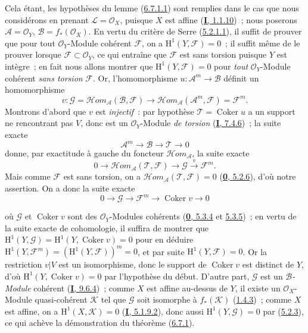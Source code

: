 Cela étant, les hypothèses du lemme
(\hyperref[II.6.7.1.1-fr]{6.7.1.1}) sont remplies dans le cas que nous
considérons en prenant $\mathcal{L}=\mathcal{O}_X$, puisque $X$ est affine
(\hyperref[I.1.1.10-fr]{\textbf{I}, 1.1.10})~; nous poserons
$\mathcal{A}=\mathcal{O}_Y$, $\mathcal{B}=f_*(\mathcal{O}_X)$. En vertu du
critère de Serre (\hyperref[II.5.2.1.1-fr]{5.2.1.1}), il suffit de prouver
que pour tout $\mathcal{O}_Y$-Module cohérent $\mathcal{F}$, on a
$\mathrm{H}^1(Y,\mathcal{F})=0$~; il suffit même de le prouver lorsque
$\mathcal{F}\subset\mathcal{O}_Y$, ce qui entraîne que $\mathcal{F}$ est
sans torsion puisque $Y$ est intègre~; en fait nous allons montrer que
$\mathrm{H}^1(Y,\mathcal{F})=0$ pour \emph{tout} $\mathcal{O}_Y$-Module
cohérent \emph{sans torsion} $\mathcal{F}$. Or, l'homomorphisme
$u:\mathcal{A}^m\to\mathcal{B}$ définit un homomorphisme
\[
v:\mathcal{G}
=\mathcal{H}om_{\mathcal{A}}(\mathcal{B},\mathcal{F})
\longrightarrow
\mathcal{H}om_{\mathcal{A}}(\mathcal{A}^m,\mathcal{F})
=\mathcal{F}^m.
\]
Montrons d'abord que $v$ est \emph{injectif}~: par hypothèse
$\mathcal{T}=\operatorname{Coker}u$ a un support ne rencontrant pas $V$, donc
est un $\mathcal{O}_Y$-Module \emph{de torsion}
(\hyperref[I.7.4.6-fr]{\textbf{I}, 7.4.6})~; la suite exacte
\[
\mathcal{A}^m\longrightarrow\mathcal{B}\longrightarrow\mathcal{T}
\longrightarrow0
\]
donne, par exactitude à gauche du foncteur
$\mathcal{H}om_{\mathcal{A}}$, la suite exacte
\[
0\longrightarrow
\mathcal{H}om_{\mathcal{A}}(\mathcal{T},\mathcal{F})
\longrightarrow\mathcal{G}\xrightarrow{v}\mathcal{F}^m.
\]
Mais comme $\mathcal{F}$ est sans torsion, on a
$\mathcal{H}om_{\mathcal{A}}(\mathcal{T},\mathcal{F})=0$
(\hyperref[0.5.2.6-fr]{\textbf{0}, 5.2.6}), d'où notre assertion. On a donc la suite
exacte
\[
0\longrightarrow\mathcal{G}\longrightarrow\mathcal{F}^m
\longrightarrow\operatorname{Coker}v\longrightarrow0
\]


où $\mathcal{G}$ et $\operatorname{Coker}v$ sont des
$\mathcal{O}_Y$-Modules cohérents
(\hyperref[0.5.3.4-fr]{\textbf{0}, 5.3.4} et
\hyperref[0.5.3.5-fr]{5.3.5})~; en vertu de la suite exacte de cohomologie,
il suffira de montrer que
$\mathrm{H}^1(Y,\mathcal{G})
=\mathrm{H}^1(Y,\operatorname{Coker}v)=0$ pour en déduire
$\mathrm{H}^1(Y,\mathcal{F}^m)
=(\mathrm{H}^1(Y,\mathcal{F}))^m=0$, et par suite
$\mathrm{H}^1(Y,\mathcal{F})=0$. Or la restriction $v|V$ est un isomorphisme,
donc le support de $\operatorname{Coker}v$ est distinct de $Y$, d'où
$\mathrm{H}^1(Y,\operatorname{Coker}v)=0$ par l'hypothèse du début. D'autre
part, $\mathcal{G}$ est un \emph{$\mathcal{B}$-Module} cohérent
(\hyperref[I.9.6.4-fr]{\textbf{I}, 9.6.4})~; comme $X$ est affine au-dessus de $Y$, il
existe un $\mathcal{O}_X$-Module quasi-cohérent $\mathcal{K}$ tel que
$\mathcal{G}$ soit isomorphe à $f_*(\mathcal{K})$
(\hyperref[II.1.4.3-fr]{1.4.3})~; comme $X$ est affine, on a
$\mathrm{H}^1(X,\mathcal{K})=0$
(\hyperref[I.5.1.9.2-fr]{\textbf{I}, 5.1.9.2}), donc aussi
$\mathrm{H}^1(Y,\mathcal{G})=0$ par
(\hyperref[II.5.2.3-fr]{5.2.3}), ce qui achève la démonstration du théorème
(\hyperref[II.6.7.1-fr]{6.7.1}).


